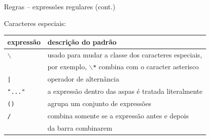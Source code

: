 \begin{frame}{Regras -- expressões regulares (cont.)}

 Caracteres especiais:\bigskip

 \footnotesize
 \center
 \begin{tabular}{ll}
   \toprule
   \bf expressão &\bf    descrição do padrão\\
   \midrule
   {\tt $\backslash$}   & usado para mudar a classe dos caracteres especiais,\\
               & por exemplo, {\tt $\backslash$*} combina com o caracter asterisco\\
    {\tt |}         &   operador de alternância\\
    {\tt "..."}     &   a expressão dentro das aspas é tratada literalmente\\
    {\tt ()}       &    agrupa um conjunto de expressões\\
    {\tt /}        &    combina somente se a expressão antes e depois\\
                 &da barra combinarem\\
   \bottomrule
 \end{tabular}
 \end{frame}

